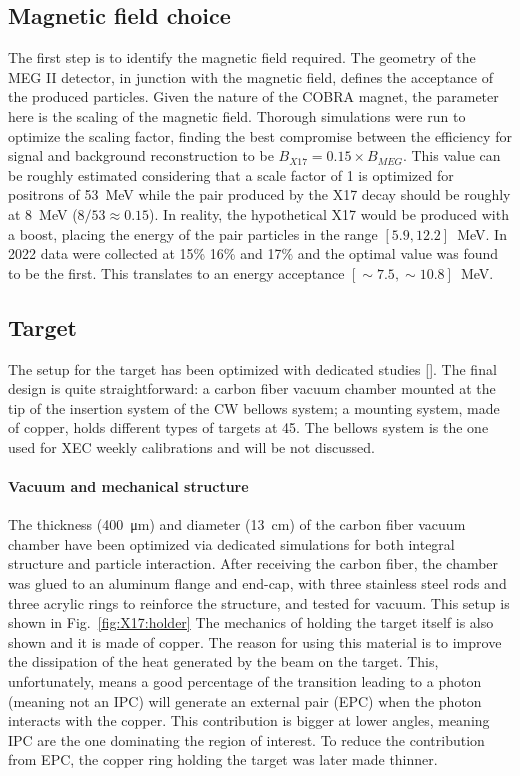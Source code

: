 \begin{refsection}
    \subsection{Magnetic field choice}
        The first step is to identify the magnetic field required. 
        The geometry of the MEG II detector, in junction with the magnetic field, defines the acceptance of the produced particles.
        Given the nature of the COBRA magnet, the parameter here is the scaling of the magnetic field.
        Thorough simulations were run to optimize the scaling factor, finding the best compromise between the efficiency for signal and background reconstruction to be $B_{X17}=0.15\times B_{MEG}$. 
        This value can be roughly estimated considering that a scale factor of 1 is optimized for positrons of \SI{53}{MeV} while the pair produced by the X17 decay should be roughly at \SI{8}{MeV} ($8/53\approx 0.15$). 
        In reality, the hypothetical X17 would be produced with a boost, placing the energy of the pair particles in the range $[5.9,12.2]$~MeV.
        In 2022 data were collected at 15\% 16\% and 17\% and the optimal value was found to be the first.
        This translates to an energy acceptance $[\sim7.5,\sim10.8]$~MeV.
        
    \subsection{Target}
        The setup for the target has been optimized with dedicated studies []. 
        The final design is quite straightforward: a carbon fiber vacuum chamber mounted at the tip of the insertion system of the CW bellows system; a mounting system, made of copper, holds different types of targets at \SI{45}{\deg}.
        The bellows system is the one used for XEC weekly calibrations and will be not discussed.
        
        \paragraph{Vacuum and mechanical structure}
        The thickness  (\SI{400}{\micro\meter}) and diameter (\SI{13}{cm}) of the carbon fiber vacuum chamber have been optimized via dedicated simulations for both integral structure and particle interaction.
        After receiving the carbon fiber, the chamber was glued to an aluminum flange and end-cap, with three stainless steel rods and three acrylic rings to reinforce the structure, and tested for vacuum.
        This setup is shown in Fig.~\ref{fig:X17:holder}
        The mechanics of holding the target itself is also shown and it is made of copper.
        The reason for using this material is to improve the dissipation of the heat generated by the beam on the target.
        This, unfortunately, means a good percentage of the transition leading to a photon (meaning not an IPC) will generate an external pair (EPC) when the photon interacts with the copper.
        This contribution is bigger at lower angles, meaning IPC are the one dominating the region of interest.
        To reduce the contribution from EPC, the copper ring holding the target was later made thinner. 


\end{refsection}

